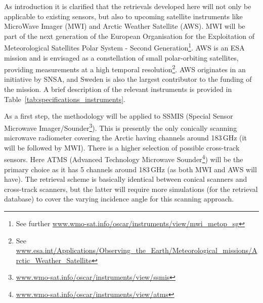 \documentclass[12pt,oneside,a4paper]{article}
\begin{document}
As introduction it is clarified that the retrievals developed here will not only be applicable to existing sensors, but also to upcoming satellite
instruments like MicroWave Imager (MWI) and Arctic Weather Satellite (AWS). MWI will be part of the next generation of the European Organisation for the
Exploitation of Meteorological Satellites Polar System - Second
Generation\footnote{See further
  \url{www.wmo-sat.info/oscar/instruments/view/mwi_metop_sg}}. AWS is an ESA mission and is envisaged as a constellation of small polar-orbiting satellites, providing measurements at a high temporal resolution\footnote{See
  \url{www.esa.int/Applications/Observing_the_Earth/Meteorological_missions/Arctic_Weather_Satellite}}.
AWS originates in an initiative by SNSA, and Sweden is also the largest
contributor to the funding of the mission. A brief description of the relevant instruments is provided in Table~\ref{tab:specifications_instruments}.

As a first step, the methodology will be applied to SSMIS (Special Sensor
Microwave Imager/Sounder\footnote{\url{www.wmo-sat.info/oscar/instruments/view/ssmis}}). This is presently the only conically scanning
microwave radiometer covering the Arctic having channels around 183\,GHz (it
will be followed by MWI). There is a higher selection of possible cross-track sensors. Here ATMS (Advanced Technology Microwave Sounder\footnote{\url{www.wmo-sat.info/oscar/instruments/view/atms}}) will be the primary choice as it has 5 channels around 183\,GHz (as both MWI and AWS will have). The retrieval scheme is basically identical between conical scanners and cross-track scanners, but the latter will require more simulations (for the retrieval database) to cover the varying incidence angle for this scanning approach.
\end{document}
